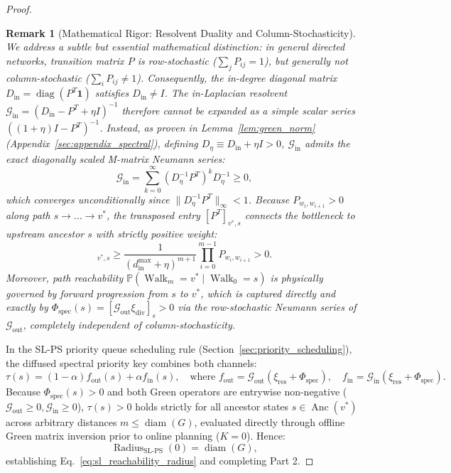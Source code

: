 \documentclass[11pt,a4paper]{article}
\newtheorem{remark}{Remark}
\begin{document}
\begin{proof}
\begin{remark}[Mathematical Rigor: Resolvent Duality and Column-Stochasticity]
We address a subtle but essential mathematical distinction: in general directed networks, transition matrix $P$ is row-stochastic ($\sum_j P_{ij} = 1$), but generally \textit{not} column-stochastic ($\sum_i P_{ij} \ne 1$). Consequently, the in-degree diagonal matrix $D_{\text{in}} = \operatorname{diag}(P^T \mathbf{1})$ satisfies $D_{\text{in}} \ne I$. The in-Laplacian resolvent $\mathcal{G}_{\text{in}} = (D_{\text{in}} - P^T + \eta I)^{-1}$ therefore cannot be expanded as a simple scalar series $((1+\eta)I - P^T)^{-1}$. 
Instead, as proven in Lemma~\ref{lem:green_norm} (Appendix~\ref{sec:appendix_spectral}), defining $D_\eta \equiv D_{\text{in}} + \eta I > 0$, $\mathcal{G}_{\text{in}}$ admits the exact diagonally scaled M-matrix Neumann series:
\begin{equation}
\label{eq:gin_m_matrix_expansion}
\mathcal{G}_{\text{in}} = \sum_{k=0}^\infty (D_\eta^{-1} P^T)^k D_\eta^{-1} \ge 0,
\end{equation}
which converges unconditionally since $\|D_\eta^{-1} P^T\|_\infty < 1$. Because $P_{w_i, w_{i+1}} > 0$ along path $s \to \dots \to v^*$, the transposed entry $[P^T]_{v^*, s}$ connects the bottleneck to upstream ancestor $s$ with strictly positive weight:
\begin{equation}
[\mathcal{G}_{\text{in}}]_{v^*, s} \ge \frac{1}{(d_{\text{in}}^{\max} + \eta)^{m+1}} \prod_{i=0}^{m-1} P_{w_i, w_{i+1}} > 0.
\end{equation}
Moreover, path reachability $\mathbb{P}(\operatorname{Walk}_m = v^* \mid \operatorname{Walk}_0 = s)$ is physically governed by forward progression from $s$ to $v^*$, which is captured directly and exactly by $\Phi_{\text{spec}}(s) = [\mathcal{G}_{\text{out}} \xi_{\text{div}}]_s > 0$ via the row-stochastic Neumann series of $\mathcal{G}_{\text{out}}$, completely independent of column-stochasticity.
\end{remark}

In the SL-PS priority queue scheduling rule (Section~\ref{sec:priority_scheduling}), the diffused spectral priority key combines both channels:
\begin{equation}
\tau(s) = (1 - \alpha) f_{\text{out}}(s) + \alpha f_{\text{in}}(s), \quad \text{where } f_{\text{out}} = \mathcal{G}_{\text{out}}(\xi_{\text{res}} + \Phi_{\text{spec}}), \quad f_{\text{in}} = \mathcal{G}_{\text{in}}(\xi_{\text{res}} + \Phi_{\text{spec}}).
\end{equation}
Because $\Phi_{\text{spec}}(s) > 0$ and both Green operators are entrywise non-negative ($\mathcal{G}_{\text{out}} \ge 0, \mathcal{G}_{\text{in}} \ge 0$), $\tau(s) > 0$ holds strictly for all ancestor states $s \in \operatorname{Anc}(v^*)$ across arbitrary distances $m \le \operatorname{diam}(G)$, evaluated directly through offline Green matrix inversion prior to online planning ($K = 0$). Hence:
\begin{equation}
\operatorname{Radius}_{\text{SL-PS}}(0) = \operatorname{diam}(G),
\end{equation}
establishing Eq.~\eqref{eq:sl_reachability_radius} and completing Part 2.


\end{proof}
\end{document}
